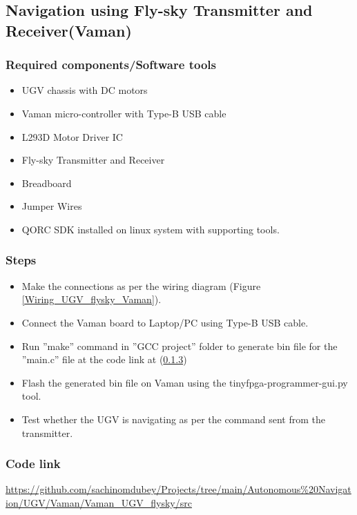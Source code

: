 \subsection{Navigation using Fly-sky Transmitter and Receiver(Vaman)} 
\subsubsection{Required components/Software tools}
\begin{itemize}
    \item  UGV chassis with DC motors
    \item  Vaman micro-controller with Type-B USB cable
    \item  L293D Motor Driver IC
    \item  Fly-sky Transmitter and Receiver
    \item  Breadboard
    \item  Jumper Wires
    \item  QORC SDK installed on linux system with supporting tools.
\end{itemize}

\subsubsection{Steps}
\begin{itemize}
    \item Make the connections as per the wiring diagram (Figure \ref{Wiring_UGV_flysky_Vaman}).
    \item Connect the Vaman board to Laptop/PC using Type-B USB cable.
    \item Run ”make” command in ”GCC project” folder to generate bin file for the ”main.c” file at the code link at (\ref{Code_link_UGV_flysky_vaman})
    \item Flash the generated bin file on Vaman using the tinyfpga-programmer-gui.py tool.
    \item Test whether the UGV is navigating as per the command sent from the transmitter.
\end{itemize}

\subsubsection{Code link} \label{Code_link_UGV_flysky_vaman}
\begin{tcolorbox}
\url{https://github.com/sachinomdubey/Projects/tree/main/Autonomous\%20Navigation/UGV/Vaman/Vaman_UGV_flysky/src}
\end{tcolorbox}

